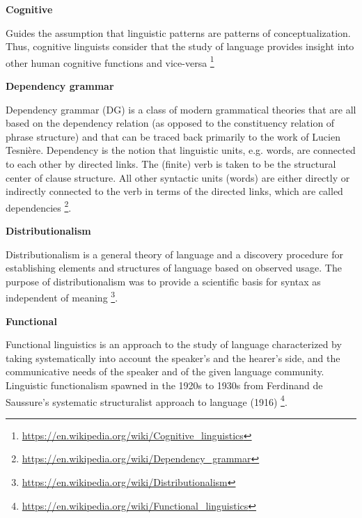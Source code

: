 \documentclass{book}
\providecommand{\ProjectDeepHeading}[2]{%
    \par\medskip\noindent\textbf{#2}\par\smallskip
}
\providecommand{\seeherefooter}[1]{\footnote{\url{#1}}}
\begin{document}
\ProjectDeepHeading{6}{Cognitive}


Guides the assumption that linguistic patterns are patterns of conceptualization. Thus, cognitive linguists consider that the study of language provides insight into other human cognitive functions and vice-versa \seeherefooter{https://en.wikipedia.org/wiki/Cognitive_linguistics}

\ProjectDeepHeading{6}{Dependency grammar}


Dependency grammar (DG) is a class of modern grammatical theories that are all based on the dependency relation (as opposed to the constituency relation of phrase structure) and that can be traced back primarily to the work of Lucien Tesnière. Dependency is the notion that linguistic units, e.g. words, are connected to each other by directed links. The (finite) verb is taken to be the structural center of clause structure. All other syntactic units (words) are either directly or indirectly connected to the verb in terms of the directed links, which are called dependencies \seeherefooter{https://en.wikipedia.org/wiki/Dependency_grammar}.

\ProjectDeepHeading{6}{Distributionalism}


Distributionalism is a general theory of language and a discovery procedure for establishing elements and structures of language based on observed usage. The purpose of distributionalism was to provide a scientific basis for syntax as independent of meaning \seeherefooter{https://en.wikipedia.org/wiki/Distributionalism}.

\ProjectDeepHeading{6}{Functional}


Functional linguistics is an approach to the study of language characterized by taking systematically into account the speaker's and the hearer's side, and the communicative needs of the speaker and of the given language community. Linguistic functionalism spawned in the 1920s to 1930s from Ferdinand de Saussure's systematic structuralist approach to language (1916) \seeherefooter{https://en.wikipedia.org/wiki/Functional_linguistics}.
    
\end{document}
